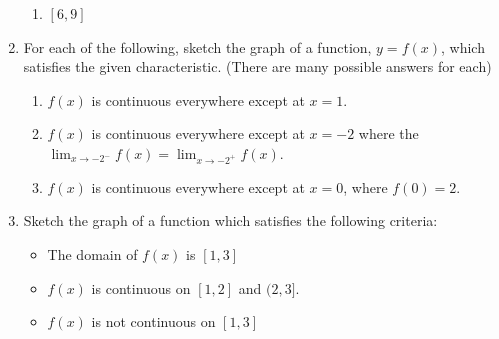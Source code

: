 \documentclass[12pt]{article}
\newif\ifans
\begin{document}
\begin{enumerate}
\begin{enumerate}
\item $[6,9]$

\ifans{\fbox{No because $f(6)$ is undefined}}\fi

\end{enumerate}

\item For each of the following, sketch the graph of a function, $y=f(x)$, which satisfies the given characteristic.  (There are many possible answers for each)

\begin{enumerate}

\item $f(x)$ is continuous everywhere except at $x=1$.

\ifans{\fbox{\parbox{1\linewidth}{Any graph for which either $f(1)$ is undefined or $\displaystyle \lim_{x \rightarrow 1}{f(x)}$ DNE or $\displaystyle \lim_{x \rightarrow 1}{f(x)} \neq f(1)$}}}\fi

\item $f(x)$ is continuous everywhere except at $x=-2$ where the $\displaystyle \lim_{x \rightarrow -2^-}{f(x)}=\lim_{x \rightarrow -2^+}{f(x)}$.

\ifans{\fbox{Any graph for which either $f(-2)$ is undefined or $\displaystyle \lim_{x \rightarrow -2}{f(x)} \neq f(-2)$}}\fi

\item $f(x)$ is continuous everywhere except at $x=0$, where $f(0)=2$.

\ifans{\fbox{Any graph for which $\displaystyle \lim_{x \rightarrow 0}{f(x)}$ DNE or $\displaystyle \lim_{x \rightarrow 0}{f(x)} \neq 2$}}\fi

\end{enumerate}

\newpage

\item Sketch the graph of a function which satisfies the following criteria:

\begin{itemize}

\item The domain of $f(x)$ is $[1,3]$

\item $f(x)$ is continuous on $[1,2]$ and $(2,3]$.

\item $f(x)$ is not continuous on $[1,3]$

\end{itemize}


\end{enumerate}
\end{document}
